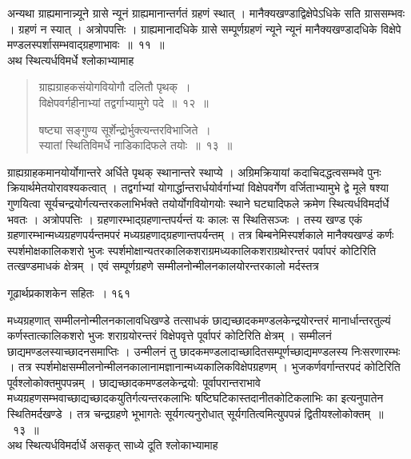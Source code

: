 \documentclass[11pt, openany]{book}
\begin{document}
\begin{sloppypar}
\noindent अन्यथा ग्राह्यमानान्न्यूने ग्रासे न्यूनं ग्राह्यमानान्तर्गतं ग्रहणं स्थात् । मानैक्यखण्डाद्विक्षेपेऽधिके सति ग्राससम्भवः । ग्रहणं न स्यात् । अत्रोपपत्तिः । ग्राह्यमानादधिके ग्रासे सम्पूर्णग्रहणं न्यूने न्यूनं मानैक्यखण्डादधिके विक्षेपे मण्डलस्पर्शासम्भवाद्ग्रहणाभावः~॥~११~॥\\
\noindent अथ स्थित्यर्धविमर्धे श्लोकाभ्यामाह\textendash
\end{sloppypar}


\begin{quote}
  {\ssi ग्राह्यग्राहकसंयोगवियोगौ दलितौ पृथक्~।\\
विक्षेपवर्गहीनाभ्यां तद्वर्गाभ्यामुगे पदे~॥~१२~॥

षष्ट्या सङ्गुण्य सूर्शेन्द्रोर्भुक्त्यन्तरविभाजिते~।\\
स्यातां स्थितिविमर्धे नाडिकादिफले तयोः~॥~१३~॥}
\end{quote}

\begin{sloppypar}
 ग्राह्यग्राहकमानयोर्योगान्तरे अर्धिते पृथक् स्थानान्तरे स्थाप्ये । अग्रिमक्रियायां कदाचिदद्धत्वसम्भवे पुनः क्रियार्थमेतयोरावश्यकत्वात् । तद्वर्गाभ्यां योगार्द्धान्तरार्धयोर्वर्गाभ्यां विक्षेपवर्गेण वर्जिताभ्यामुभे द्वे मूले षश्या गुणयित्वा सूर्यचन्द्रयोर्गत्यन्तरकलाभिर्भक्ते तयोर्योगवियोगयोः स्थाने घट्यादिफले क्रमेण स्थित्यर्धविमर्दार्धे भवतः । अत्रोपपत्तिः । ग्रहणारम्भाद्ग्रहणान्तपर्यन्तं यः कालः स स्थितिसञ्जः । तस्य खण्ड एकं ग्रहणारम्भान्मध्यग्रहणपर्यन्तमपरं मध्यग्रहणाद्ग्रहणान्तपर्यन्तम् । तत्र बिम्बनेमिस्पर्शकाले मानैक्यखण्डं कर्णः स्पर्शमोक्षकालिकशरो भुजः स्पर्शमोक्षान्यतरकालिकशराग्रमध्यकालिकशराग्रथोरन्तरं पर्वापरं कोटिरिति तत्खण्डमाधकं क्षेत्रम् । एवं सम्पूर्णग्रहणे सम्मीलनोन्मीलनकालयोरन्तरकालो मर्दस्तत्र
\end{sloppypar}


\newpage



\hspace{3cm}  गूढार्थप्रकाशकेन सहितः~। \hfill १६१
\vspace{1cm}

\begin{sloppypar}
\noindent मध्यग्रहणात् सम्मीलनोन्मीलनकालावधिखण्डे तत्साधकं छाद्यच्छादकमण्डलकेन्द्रयोरन्तरं मानार्धान्तरतुल्यं कर्णस्तात्कालिकशरो भुजः शराग्रयोरन्तरं विक्षेपवृत्ते पूर्वापरं कोटिरिति क्षेत्रम् । सम्मीलनं छाद्यमण्डलस्याच्छादनसमाप्तिः । उन्मीलनं तु छादकमण्डलादाच्छादितसम्पूर्णच्छाद्यमण्डलस्य निःसरणारम्भः । तत्र स्पर्शमोक्षसम्मीलनोन्मीलनकालानामज्ञानान्मध्यकालिकविक्षेपग्रहणम् । भुजकर्णवर्गान्तरपदं कोटिरिति पूर्वश्लोकोक्तमुपपन्नम् । छाद्यच्छादकमण्डलकेन्द्रयो: पूर्वापरान्तराभावे मध्यग्रहणसम्भवाच्छाद्यच्छादकयुतिर्गत्यन्तरकलाभिः षष्टिघटिकास्तदानीतकोटिकलाभिः का इत्यनुपातेन स्थितिमर्दखण्डे । तत्र चन्द्रग्रहणे भूभागतेः सूर्यगत्यनुरोधात् सूर्यगतित्वमित्युपपन्नं द्वितीयश्लोकोक्तम्~॥~१३~॥\\
\noindent अथ स्थित्यर्धविमर्दार्धे असकृत् साध्ये दूति श्लोकाभ्यामाह\textendash
\end{sloppypar}
\end{document}
